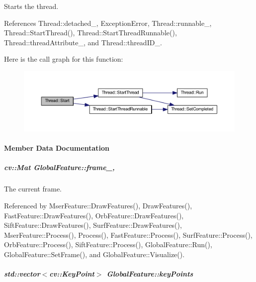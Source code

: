 Starts the thread. 



References Thread\-::detached\-\_\-, Exception\-Error, Thread\-::runnable\-\_\-, Thread\-::\-Start\-Thread(), Thread\-::\-Start\-Thread\-Runnable(), Thread\-::thread\-Attribute\-\_\-, and Thread\-::thread\-I\-D\-\_\-.



Here is the call graph for this function\-:
\nopagebreak
\begin{figure}[H]
\begin{center}
\leavevmode
\includegraphics[width=350pt]{group___core_a2b42f82341afd2747ea093b6ac8b91cb_cgraph}
\end{center}
\end{figure}




\paragraph{Member Data Documentation}
\hypertarget{group___feature_extractor_aae4295da2c3999edcb99b46d70ee7166}{
\subparagraph[{frame\-\_\-}]{\setlength{\rightskip}{0pt plus 5cm}cv\-::\-Mat Global\-Feature\-::frame\-\_\-\hspace{0.3cm}{\ttfamily [protected]}, {\ttfamily [inherited]}}}\label{group___feature_extractor_aae4295da2c3999edcb99b46d70ee7166}


The current frame. 



Referenced by Mser\-Feature\-::\-Draw\-Features(), Draw\-Features(), Fast\-Feature\-::\-Draw\-Features(), Orb\-Feature\-::\-Draw\-Features(), Sift\-Feature\-::\-Draw\-Features(), Surf\-Feature\-::\-Draw\-Features(), Mser\-Feature\-::\-Process(), Process(), Fast\-Feature\-::\-Process(), Surf\-Feature\-::\-Process(), Orb\-Feature\-::\-Process(), Sift\-Feature\-::\-Process(), Global\-Feature\-::\-Run(), Global\-Feature\-::\-Set\-Frame(), and Global\-Feature\-::\-Visualize().

\hypertarget{group___feature_extractor_a72cc606c0090a64718a7e92bca7520b9}{
\subparagraph[{key\-Points}]{\setlength{\rightskip}{0pt plus 5cm}std\-::vector$<$cv\-::\-Key\-Point$>$ Global\-Feature\-::key\-Points\hspace{0.3cm}{\ttfamily [inherited]}}}\label{group___feature_extractor_a72cc606c0090a64718a7e92bca7520b9}


